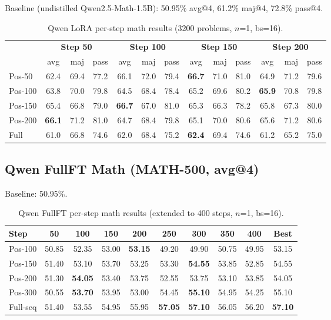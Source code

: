 \documentclass[10pt]{article}
\begin{document}
Baseline (undistilled Qwen2.5-Math-1.5B): 50.95\% avg@4, 61.2\% maj@4, 72.8\% pass@4.

\begin{table}[h]
\centering
\caption{Qwen LoRA per-step math results (3200 problems, $n$=1, bs=16).}
\footnotesize
\begin{tabular}{@{}lcccccccccccc@{}}
\toprule
& \multicolumn{3}{c}{\textbf{Step 50}} & \multicolumn{3}{c}{\textbf{Step 100}} & \multicolumn{3}{c}{\textbf{Step 150}} & \multicolumn{3}{c}{\textbf{Step 200}} \\
\cmidrule(lr){2-4} \cmidrule(lr){5-7} \cmidrule(lr){8-10} \cmidrule(lr){11-13}
& avg & maj & pass & avg & maj & pass & avg & maj & pass & avg & maj & pass \\
\midrule
Pos-50  & 62.4 & 69.4 & 77.2 & 66.1 & 72.0 & 79.4 & \textbf{66.7} & 71.0 & 81.0 & 64.9 & 71.2 & 79.6 \\
Pos-100 & 63.8 & 70.0 & 79.8 & 64.5 & 68.4 & 78.4 & 65.2 & 69.6 & 80.2 & \textbf{65.9} & 70.8 & 79.8 \\
Pos-150 & 65.4 & 66.8 & 79.0 & \textbf{66.7} & 67.0 & 81.0 & 65.3 & 66.3 & 78.2 & 65.8 & 67.3 & 80.0 \\
Pos-200 & \textbf{66.1} & 71.2 & 81.0 & 64.7 & 68.4 & 79.8 & 65.1 & 70.0 & 80.6 & 65.6 & 71.2 & 80.6 \\
Full    & 61.0 & 66.8 & 74.6 & 62.0 & 68.4 & 75.2 & \textbf{62.4} & 69.4 & 74.6 & 61.2 & 65.2 & 75.0 \\
\bottomrule
\end{tabular}
\end{table}

\subsection{Qwen FullFT Math (MATH-500, avg@4)}

Baseline: 50.95\%.

\begin{table}[h]
\centering
\caption{Qwen FullFT per-step math results (extended to 400 steps, $n$=1, bs=16).}
\small
\begin{tabular}{@{}lccccccccc@{}}
\toprule
\textbf{Step} & 50 & 100 & 150 & 200 & 250 & 300 & 350 & 400 & \textbf{Best} \\
\midrule
Pos-100  & 50.85 & 52.35 & 53.00 & \textbf{53.15} & 49.20 & 49.90 & 50.75 & 49.95 & 53.15 \\
Pos-150  & 51.40 & 53.10 & 53.70 & 53.25 & 53.30 & \textbf{54.55} & 53.85 & 52.85 & 54.55 \\
Pos-200  & 51.30 & \textbf{54.05} & 53.40 & 53.75 & 52.55 & 53.75 & 53.10 & 53.85 & 54.05 \\
Pos-300  & 50.55 & \textbf{53.70} & 53.95 & 53.00 & 54.45 & \textbf{55.10} & 54.95 & 54.25 & 55.10 \\
Full-seq & 51.40 & 53.55 & 54.95 & 55.95 & \textbf{57.05} & \textbf{57.10} & 56.05 & 56.20 & \textbf{57.10} \\
\bottomrule
\end{tabular}
\end{table}
\end{document}
